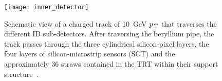 \begin{figure}[!h]
  \centering
    \texttt{[image: inner\_detector]}
    \caption{Schematic view of a charged track of 10~GeV $p_\mathrm{\, T}$ that traverses
      the different ID sub-detectors. After traversing the beryllium pipe, the
      track passes through the three cylindrical silicon-pixel layers, the four
      layers of silicon-microstrip sensors (SCT) and the approximately 36 straws
      contained in the TRT within their support structure~\cite{ATLASPaper}.}
    \label{fig:id}
\end{figure}
